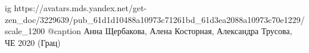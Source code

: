  
 
 
 
 

\ifcmt
  ig https://avatars.mds.yandex.net/get-zen_doc/3229639/pub_61d1d10488a10973c71261bd_61d3ea2088a10973c70e1229/scale_1200
  @caption Анна Щербакова, Алена Косторная, Александра Трусова, ЧЕ 2020 (Грац)
\fi
